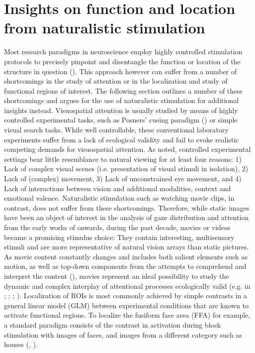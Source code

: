 \documentclass[a4paper, 12pt]{scrreprt}
\begin{document}
\section{Insights on function and location from naturalistic stimulation}\label{section:shortcomings}
Most research paradigms in neuroscience employ highly controlled stimulation protocols to precisely pinpoint and disentangle the function or location of the structure in question (\cite{malinen2007towards}). This approach however can suffer from a number of shortcomings in the study of attention or in the localization and study of functional regions of interest. The following section outlines a number of these shortcomings and argues for the use of naturalistic stimulation for additional insights instead. \newline 
Visuospatial attention is usually studied by means of highly controlled experimental tasks, such as Posners' cueing paradigm (\cite{posner1980attention}) or simple visual search tasks. While well controllable, these conventional laboratory experiments suffer from a lack of ecological validity and fail to evoke realistic competing demands for visuospatial attention. As \textcite{hasson2004intersubject} noted, controlled experimental settings bear little resemblance to natural viewing for at least four reasons: 1) Lack of complex visual scenes (i.e. presentation of visual stimuli in isolation), 2) Lack of (complex) movement, 3) Lack of unconstrained eye movement, and 4) Lack of interactions between vision and additional modalities, context and emotional valence. Naturalistic stimulation such as watching movie clips, in contrast, does not suffer from these shortcomings. Therefore, while static images have been an object of interest in the analysis of gaze distribution and attention from the early works of \textcite{yarbus1967eye} onwards, during the past decade, movies or videos became a promising stimulus choice: They contain interesting, multisensory stimuli and are more representative of natural vision arrays than static pictures. As movie content constantly changes and includes both salient elements such as motion, as well as top-down components from the attempts to comprehend and interpret the content (\cite{ross2013eye}), movies represent an ideal possibility to study the dynamic and complex interplay of attentional processes ecologically valid (e.g. in \textcite{hasson2004intersubject}; \cite{carmi2006visual}; \cite{tseng2009quantifying}; \cite{dorr2010variability}). \newline
Localization of ROIs is most commonly achieved by simple contrasts in a general linear model (GLM) between experimental conditions that are known to activate functional regions. To localize the fusiform face area (FFA) for example, a standard paradigm consists of the contrast in activation during block stimulation with images of faces, and images from a different category such as houses (\cite{sengupta2016studyforrest}, \cite{fox2009defining}).
\end{document}
